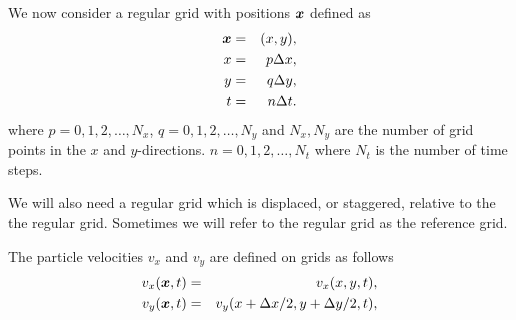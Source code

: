 \documentclass[11pt]{article}
\begin{document}
We now consider a regular grid with positions $\mbox{\boldmath $x$}$ 
defined as
\begin{eqnarray}
\mbox{\boldmath $x$} & = & (x,y),\\
x   & = & p\Delta x,\\
y   & = & q\Delta y,\\
t   & = & n\Delta t.
\end{eqnarray}
where $p=0,1,2,\ldots,N_x$, $q=0,1,2,\ldots,N_y$ and
$N_x,N_y$ are the number of grid points in the $x$ and 
$y$-directions.
$n=0,1,2,\ldots,N_t$ where $N_t$ is the number of time steps.

We will also need a regular grid which is displaced, or staggered, 
relative to the the regular grid.
Sometimes we will refer to the regular grid as the reference grid.

The particle velocities  $v_x$ and $v_y$ are defined on grids
as follows
%
\begin{eqnarray}
  v_x(\mbox{\boldmath $x$}, t) & = & v_x(x, y, t),\nonumber\\
  v_y(\mbox{\boldmath $x$}, t) & = & v_y(x+\Delta x/2, y+\Delta y/2, t),\nonumber\\
\end{eqnarray}
%
\end{document}
